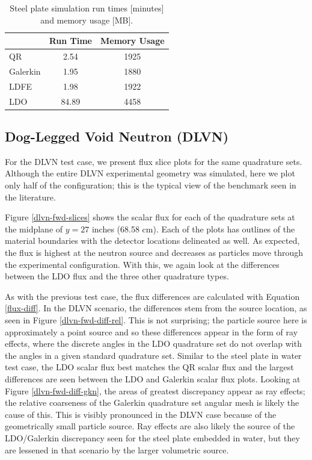 \documentclass{article} %
\begin{document}
\begin{table}[!htb]
\centering
\caption{Steel plate simulation run times [minutes] and memory usage [MB].}
\label{steel-stats}
\begin{tabular}{l|cc}
              & Run Time       & Memory Usage       \\ \hline
QR            & 2.54 & 1925         \\
Galerkin      & 1.95 & 1880         \\
LDFE          & 1.98 & 1922         \\
LDO           & 84.89 & 4458
\end{tabular}
\end{table}

\FloatBarrier
\subsection{Dog-Legged Void Neutron (DLVN)}

For the DLVN test case, we present flux slice plots for the same 
quadrature sets. Although the entire DLVN
experimental geometry was simulated, here we plot only half of the
configuration; this is the typical view of the benchmark seen in the
literature.

Figure \ref{dlvn-fwd-slices} shows the scalar flux for each of the
quadrature sets at the midplane of $y = 27$ inches (68.58 cm).
Each of the plots has outlines of the material boundaries with the detector
locations delineated as well. As expected, the flux is highest at the neutron
source and decreases as particles move through the experimental configuration.
With this, we again look at the differences between the LDO flux
and the three other quadrature types. 

As with the previous test case, the flux differences are calculated with
Equation \eqref{flux-diff}. In the DLVN scenario, the differences stem from
the source location, as seen in Figure \ref{dlvn-fwd-diff-rel}. This is not
surprising; the particle source here is approximately a point source and so
these differences appear in the form of ray effects, where the discrete angles
in the LDO quadrature set do not overlap with the angles in a given standard
quadrature set. Similar to the steel plate in water test case, the LDO scalar
flux best matches the QR scalar flux and the largest differences are seen
between the LDO and Galerkin scalar flux plots. Looking at Figure 
\ref{dlvn-fwd-diff-gkn}, the areas of greatest discrepancy appear as ray effects;
the relative coarseness of the Galerkin quadrature set angular mesh is likely the
cause of this. This is visibly pronounced in the DLVN case because of the
geometrically small particle source. Ray effects are also likely the source of
the  LDO/Galerkin discrepancy seen for the steel plate embedded in water, but
they are lessened in that scenario by the larger volumetric source.
\end{document}

